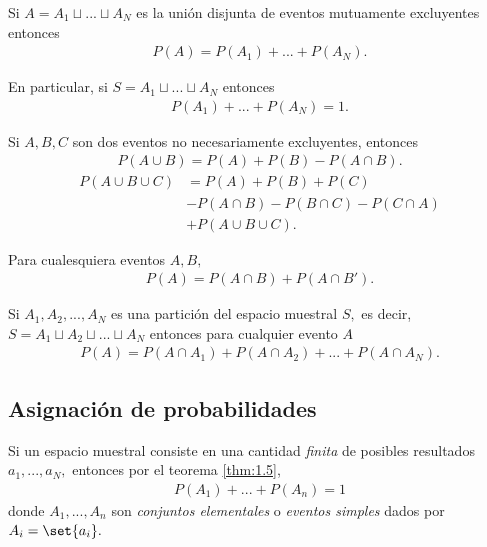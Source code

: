 {}
\begin{thm}
 \label{thm:1.5} Si $A=A_{1}\sqcup...\sqcup A_{N}$ es la unión disjunta de eventos mutuamente excluyentes entonces
 \begin{align}
 \label{1.8}
P(A)=P(A_{1})+...+P(A_{N}).
\end{align}


En particular, si $S=A_{1}\sqcup...\sqcup A_{N}$ entonces
 \begin{align}
 \label{1.9}
P(A_{1})+...+P(A_{N})=1.
\end{align}
\end{thm}


{}
\begin{thm}
 \label{thm:1.6}
  Si $A,B,C$ son dos eventos no necesariamente excluyentes, entonces
 \begin{align}
   \label{1.10}
   P(A\cup B)=P(A)+P(B)-P(A\cap B).
 \end{align}
 \begin{align}
 \label{1.11}
	P(A\cup B \cup C)&=P(A)+P(B)+P(C)\\
	&-P(A\cap B)-P(B\cap C)-P(C\cap A)\\
	&+P(A\cup B \cup C).
\end{align}
\end{thm}



{}
\begin{thm}
\label{thm:1.7}
 Para cualesquiera eventos $A,B,$
\begin{align}
 \label{1.12}
 P(A)=P(A\cap B)+P(A\cap B').
\end{align}
\end{thm}


{}
\begin{thm}
 \label{thm:1.8}
 Si $A_{1},A_{2},..., A_{N}$ es una partición del espacio muestral $S,$ es decir,
 $S=A_{1} \sqcup A_{2} \sqcup ... \sqcup A_{N}$ entonces para cualquier evento $A$
 \begin{align}
  \label{1.13}
  P(A)=P(A\cap A_{1})+ P(A\cap A_{2}) + ... +P(A\cap A_{N}).
 \end{align}
\end{thm}


\subsection{Asignación de probabilidades}
 {}
 Si un espacio muestral consiste en una cantidad \emph{finita} de posibles resultados $a_{1},...,a_{N},$ entonces por el teorema \ref{thm:1.5},
 \begin{align}
  \label{1.14}
  P(A_{1})+...+P(A_{n})=1
 \end{align}
 donde $A_{1},...,A_{n}$ son \emph{conjuntos elementales} o \emph{eventos simples} dados por $A_{i}=\set{a_{i}}.$



